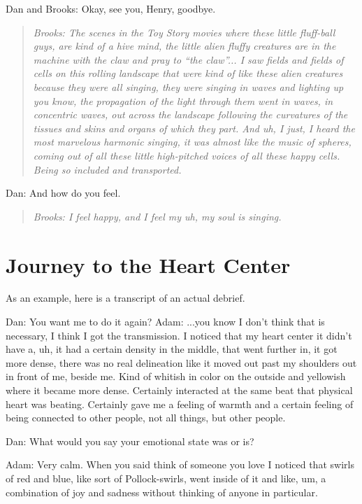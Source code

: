 \documentclass[12pt]{book}
\begin{document}
Dan and Brooks: Okay,  see you, Henry, goodbye.


\begin{quote}{\em
Brooks:  The scenes in the Toy Story movies where these
little fluff-ball guys, are kind of a hive mind,
the little alien fluffy creatures are in the machine
with the claw and pray to ``the claw''...
I saw fields and fields of cells on this rolling landscape
that were kind of like these alien creatures because they
were all singing, they were singing in waves and lighting up
you know, the propagation of the light through them went
in waves, in concentric waves, out across the landscape
following the curvatures of the tissues and skins and organs
of which they part. And uh, I just,  I heard the most marvelous harmonic
singing, it was almost like the music of spheres,
coming out of all these little high-pitched voices 
of all these happy cells.
Being so included and transported.
}\end{quote}

Dan: And how do you feel.

\begin{quote}{\em
Brooks: I feel happy, and I feel my uh, my soul is singing.
}\end{quote}    

\section{Journey to the Heart Center}

As an example, here is a transcript of an actual debrief.

\hrulefill

Dan: You want me to do it again?
Adam: ...you know I don’t think that is necessary, I think I got the transmission. I noticed that my heart center it didn't have a, uh, it had a certain density in the middle, that went further in, it got more dense, there was no real delineation like it moved out past my shoulders out in front of me, beside me. Kind of whitish in color on the outside and yellowish where it became more dense. Certainly interacted at the same beat that physical heart was beating. Certainly gave me a feeling of warmth and a certain feeling of being connected to other people, not all things, but other people.
					
Dan: What would you say your emotional state was or is?
					
Adam: Very calm. When you said think of someone you love I noticed that swirls of red and blue, like sort of Pollock-swirls, went inside of it and like, um, a combination of joy and sadness without thinking of anyone in particular.
					
\end{document}
